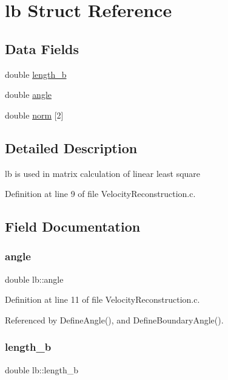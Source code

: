 \hypertarget{structlb}{}\section{lb Struct Reference}
\label{structlb}
\subsection*{Data Fields}
\begin{DoxyCompactItemize}
\item 
double \mbox{\hyperlink{structlb_a7f4b1a6c1c8446cde504704489e9a75f}{length\+\_\+b}}
\item 
double \mbox{\hyperlink{structlb_a284a6ff364b4f64628f7a02f24251cb1}{angle}}
\item 
double \mbox{\hyperlink{structlb_a661e852334d1c5f1c8552b1eb2f06db8}{norm}} \mbox{[}2\mbox{]}
\end{DoxyCompactItemize}


\subsection{Detailed Description}
lb is used in matrix calculation of linear least square 

Definition at line 9 of file Velocity\+Reconstruction.\+c.



\subsection{Field Documentation}
\mbox{\label{structlb_a284a6ff364b4f64628f7a02f24251cb1}} 
\subsubsection{\texorpdfstring{angle}{angle}}
{\footnotesize\ttfamily double lb\+::angle}



Definition at line 11 of file Velocity\+Reconstruction.\+c.



Referenced by Define\+Angle(), and Define\+Boundary\+Angle().

\mbox{\label{structlb_a7f4b1a6c1c8446cde504704489e9a75f}} 
\subsubsection{\texorpdfstring{length\_b}{length\_b}}
{\footnotesize\ttfamily double lb\+::length\+\_\+b}



